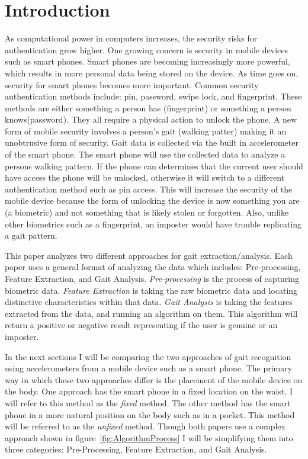 \documentclass{sig-alternate}
\begin{document}
\section{Introduction}
	As computational power in computers increases, the security risks for authentication grow higher. One growing concern is security in mobile devices such as smart phones. Smart phones are becoming increasingly more powerful, which results in more personal data being stored on the device. As time goes on, security for smart phones becomes more important. Common security authentication methods include: pin, password, swipe lock, and fingerprint. These methods are either something a person has (fingerprint) or something a person knows(password). They all require a physical action to unlock the phone. A new form of mobile security involves a person's gait (walking patter) making it an unobtrusive form of security. Gait data is collected via the built in accelerometer of the smart phone. The smart phone will use the collected data to analyze a persons walking pattern. If the phone can determines that the current user should have access the phone will be unlocked, otherwise it will switch to a different authentication method such as pin access. This will increase the security of the mobile device because the form of unlocking the device is now something you are (a biometric) and not something that is likely stolen or forgotten. Also, unlike other biometrics such as a fingerprint, an imposter would have trouble replicating a gait pattern. 
	
	This paper analyzes two different approaches for gait extraction/analysis. Each paper uses a general format of analyzing the data which includes: Pre-processing, Feature Extraction, and Gait Analysis. \textit{Pre-processing} is the process of capturing biometric data. \textit{Feature Extraction} is taking the raw biometric data and locating distinctive characteristics within that data. \textit{Gait Analysis} is taking the features extracted from the data, and running an algorithm on them. This algorithm will return a positive or negative result representing if the user is genuine or an imposter. 

	In the next sections I will be comparing the two approaches of gait recognition using accelerometers from a mobile device such as a smart phone. The primary way in which these two approaches differ is the placement of the mobile device on the body. One approach has the smart phone in a fixed location on the waist. I will refer to this method as the \textit{fixed} method. The other method has the smart phone in a more natural position on the body such as in a pocket. This method will be referred to as the \textit{unfixed} method. Though both papers use a complex approach shown in figure~\ref{fig:AlgorithmProcess} I will be simplifying them into three categories: Pre-Processing, Feature Extraction, and Gait Analysis. 
	
\end{document}
